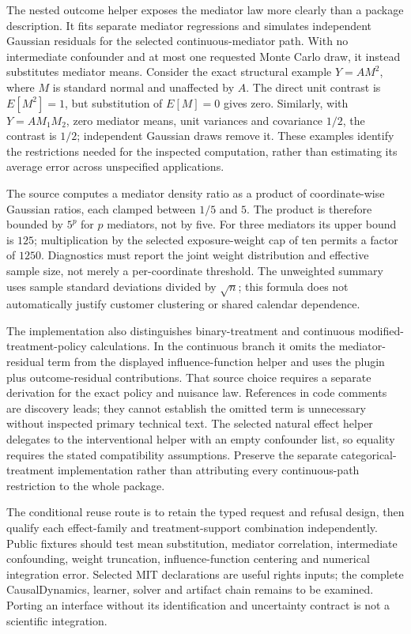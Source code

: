 The nested outcome helper exposes the mediator law more clearly than a package
description. It fits separate mediator regressions and simulates independent
Gaussian residuals for the selected continuous-mediator path. With no
intermediate confounder and at most one requested Monte Carlo draw, it instead
substitutes mediator means. Consider the exact structural example
$Y=A M^2$, where $M$ is standard normal and unaffected by $A$. The direct unit
contrast is $E[M^2]=1$, but substitution of $E[M]=0$ gives zero. Similarly, with
$Y=A M_1M_2$, zero mediator means, unit variances and covariance $1/2$, the
contrast is $1/2$; independent Gaussian draws remove it. These examples identify
the restrictions needed for the inspected computation, rather than estimating
its average error across unspecified applications.~\citep{exec25_omed_causalmediation,exec25_omed_choice}

The source computes a mediator density ratio as a product of coordinate-wise
Gaussian ratios, each clamped between $1/5$ and $5$. The product is therefore
bounded by $5^p$ for $p$ mediators, not by five. For three mediators its upper
bound is $125$; multiplication by the selected exposure-weight cap of ten
permits a factor of $1250$. Diagnostics must report the joint weight
distribution and effective sample size, not merely a per-coordinate threshold.
The unweighted summary uses sample standard deviations divided by $\sqrt n$;
this formula does not automatically justify customer clustering or shared
calendar dependence.~\citep{exec25_omed_causalmediation,exec25_omed_choice}

The implementation also distinguishes binary-treatment and continuous
modified-treatment-policy calculations. In the continuous branch it omits
the mediator-residual term from the displayed influence-function helper and
uses the plugin plus outcome-residual contributions. That source choice requires
a separate derivation for the exact policy and nuisance law. References in code
comments are discovery leads; they cannot establish the omitted term is
unnecessary without inspected primary technical text. The selected natural
effect helper delegates to the interventional helper with an empty confounder
list, so equality requires the stated compatibility assumptions. Preserve the
separate categorical-treatment implementation rather than attributing every
continuous-path restriction to the whole package.~\citep{exec25_omed_causalmediation}

The conditional reuse route is to retain the typed request and refusal design,
then qualify each effect-family and treatment-support combination independently.
Public fixtures should test mean substitution, mediator correlation, intermediate
confounding, weight truncation, influence-function centering and numerical
integration error. Selected MIT declarations are useful rights inputs; the
complete CausalDynamics, learner, solver and artifact chain remains to be
examined. Porting an interface without its identification and uncertainty
contract is not a scientific integration.~\citep{exec25_omed_causalmediation,exec25_omed_targeted,exec25_omed_choice}

